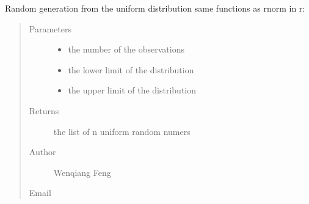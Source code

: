 \documentclass[letterpaper,12pt,english]{sphinxmanual}
\begin{document}
\begin{fulllineitems}
Random generation from the uniform distribution
same functions as rnorm in r: 
\begin{quote}\begin{description}
\item[{Parameters}] \leavevmode\begin{itemize}
\item {} 
 \textendash{} the number of the observations

\item {} 
 \textendash{} the lower limit of the distribution

\item {} 
 \textendash{} the upper limit of the distribution

\end{itemize}

\item[{Returns}] \leavevmode
the list of n uniform random numers

\item[{Author}] \leavevmode
Wenqiang Feng

\item[{Email}] \leavevmode
{}

\end{description}\end{quote}

\end{fulllineitems}



\section{}
\label{\detokenize{api:module-statspy.tests}}\label{\detokenize{api:t-test}}
\end{document}
